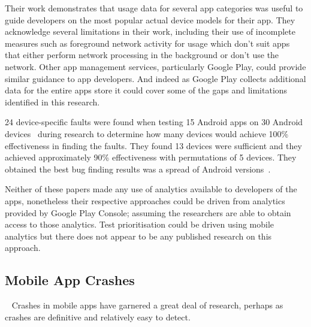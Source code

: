 Their work demonstrates that usage data for several app categories was useful to guide developers on the most popular actual device models for their app. They acknowledge several limitations in their work, including their use of incomplete measures such as foreground network activity for usage which don't suit apps that either perform network processing in the background or don't use the network. Other app management services, particularly Google Play, could provide similar guidance to app developers. And indeed as Google Play collects additional data for the entire apps store it could cover some of the gaps and limitations identified in this research.

24 device-specific faults were found when testing 15 Android apps on 30 Android devices~ during research to determine how many devices would achieve 100\% effectiveness in finding the faults. They found 13 devices were sufficient and they achieved approximately 90\% effectiveness with permutations of 5 devices. They obtained the best bug finding results was a spread of Android versions~. 

Neither of these papers made any use of analytics available to developers of the apps, nonetheless their respective approaches could be driven from analytics provided by Google Play Console; assuming the researchers are able to obtain access to those analytics. Test prioritisation could be driven using mobile analytics but there does not appear to be any published research on this approach.

\afterpage{\clearpage}

\subsection{Mobile App Crashes}~\label{rw-mobile-app-crashes-topic}
Crashes in mobile apps have garnered a great deal of research, perhaps as crashes are definitive and relatively easy to detect.

